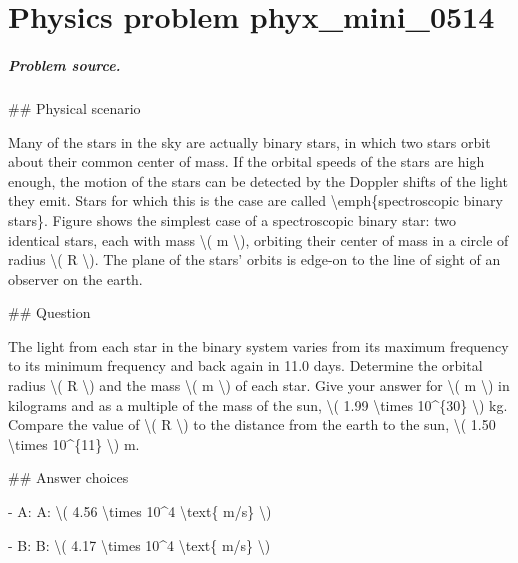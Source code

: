 
\chapter{Physics problem phyx\_mini\_0514}
\label{ch:PhyXMiniProblems_problem_phyx_mini_0514}

\paragraph{Problem source.}
\#\# Physical scenario

Many of the stars in the sky are actually binary stars, in which two stars orbit about their common center of mass. If the orbital speeds of the stars are high enough, the motion of the stars can be detected by the Doppler shifts of the light they emit. Stars for which this is the case are called \textbackslash{}emph\{spectroscopic binary stars\}. Figure shows the simplest case of a spectroscopic binary star: two identical stars, each with mass \textbackslash{}( m \textbackslash{}), orbiting their center of mass in a circle of radius \textbackslash{}( R \textbackslash{}). The plane of the stars' orbits is edge-on to the line of sight of an observer on the earth.

\#\# Question

The light from each star in the binary system varies from its maximum frequency to its minimum frequency and back again in 11.0 days. Determine the orbital radius \textbackslash{}( R \textbackslash{}) and the mass \textbackslash{}( m \textbackslash{}) of each star. Give your answer for \textbackslash{}( m \textbackslash{}) in kilograms and as a multiple of the mass of the sun, \textbackslash{}( 1.99 \textbackslash{}times 10\textasciicircum{}\{30\} \textbackslash{}) kg. Compare the value of \textbackslash{}( R \textbackslash{}) to the distance from the earth to the sun, \textbackslash{}( 1.50 \textbackslash{}times 10\textasciicircum{}\{11\} \textbackslash{}) m.

\#\# Answer choices

- A: A: \textbackslash{}( 4.56 \textbackslash{}times 10\textasciicircum{}4 \textbackslash{}text\{ m/s\} \textbackslash{})

- B: B: \textbackslash{}( 4.17 \textbackslash{}times 10\textasciicircum{}4 \textbackslash{}text\{ m/s\} \textbackslash{})

